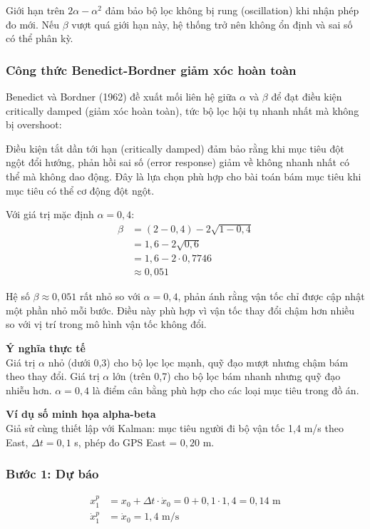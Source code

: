 Giới hạn trên $2\alpha - \alpha^2$ đảm bảo bộ lọc không bị rung (oscillation) khi nhận phép đo mới. Nếu $\beta$ vượt quá giới hạn này, hệ thống trở nên không ổn định và sai số có thể phân kỳ.

\subsubsection{Công thức Benedict-Bordner giảm xóc hoàn toàn}

\hspace{0.5cm} Benedict và Bordner (1962) \cite{benedict1962synthesis} đề xuất mối liên hệ giữa $\alpha$ và $\beta$ để đạt điều kiện critically damped (giảm xóc hoàn toàn), tức bộ lọc hội tụ nhanh nhất mà không bị overshoot:


Điều kiện tắt dần tới hạn (critically damped) đảm bảo rằng khi mục tiêu đột ngột đổi hướng, phản hồi sai số (error response) giảm về không nhanh nhất có thể mà không dao động. Đây là lựa chọn phù hợp cho bài toán bám mục tiêu khi mục tiêu có thể cơ động đột ngột.

Với giá trị mặc định $\alpha = 0{,}4$:
\begin{align*}
    \beta &= (2 - 0{,}4) - 2\sqrt{1 - 0{,}4} \\
          &= 1{,}6 - 2\sqrt{0{,}6} \\
          &= 1{,}6 - 2 \cdot 0{,}7746 \\
          &\approx 0{,}051
\end{align*}

Hệ số $\beta \approx 0{,}051$ rất nhỏ so với $\alpha = 0{,}4$, phản ánh rằng vận tốc chỉ được cập nhật một phần nhỏ mỗi bước. Điều này phù hợp vì vận tốc thay đổi chậm hơn nhiều so với vị trí trong mô hình vận tốc không đổi.

\textbf{Ý nghĩa thực tế\\} Giá trị $\alpha$ nhỏ (dưới 0,3) cho bộ lọc lọc mạnh, quỹ đạo mượt nhưng chậm bám theo thay đổi. Giá trị $\alpha$ lớn (trên 0,7) cho bộ lọc bám nhanh nhưng quỹ đạo nhiễu hơn. $\alpha = 0{,}4$ là điểm cân bằng phù hợp cho các loại mục tiêu trong đồ án.

\textbf{Ví dụ số minh họa alpha-beta\\} Giả sử cùng thiết lập với Kalman: mục tiêu người đi bộ vận tốc 1,4 m/s theo East, $\Delta t = 0{,}1$ s, phép đo GPS East = $0{,}20$ m.

\subsubsection{Bước 1: Dự báo\\}
\begin{align*}
    x_1^p &= x_0 + \Delta t \cdot \dot{x}_0 = 0 + 0{,}1 \cdot 1{,}4 = 0{,}14 \text{ m} \\
    \dot{x}_1^p &= \dot{x}_0 = 1{,}4 \text{ m/s}
\end{align*}


